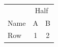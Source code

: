 \begin{tabular}{lcc}
\toprule
& \multicolumn{2}{c}{Half} \\
Name & A & B \\
\midrule
Row & 1 & 2 \\
\bottomrule
\end{tabular}
